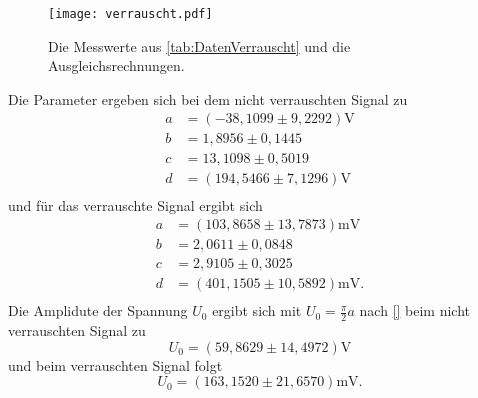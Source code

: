 \begin{figure}[H]
  \centering
  \texttt{[image: verrauscht.pdf]}
  \caption{Die Messwerte aus \autoref{tab:DatenVerrauscht} und die Ausgleichsrechnungen.}
  \label{fig:verrauscht}
\end{figure}
Die Parameter ergeben sich bei dem nicht verrauschten Signal zu
\begin{align*}
  a &= (-38,1099\pm 9,2292)\unit{\volt}\\
  b &= 1,8956\pm 0,1445\\
  c &= 13,1098\pm 0,5019\\
  d &= (194,5466\pm 7,1296)\unit{\volt}\\
\end{align*}
und für das verrauschte Signal ergibt sich
\begin{align*}
  a &= (103,8658\pm 13,7873)\unit{\milli\volt}\\
  b &= 2,0611\pm 0,0848\\
  c &= 2,9105\pm 0,3025\\
  d &= (401,1505\pm 10,5892)\unit{\milli\volt}.\\
\end{align*}
Die Amplidute der Spannung $U_0$ ergibt sich mit $U_0 = \frac{\pi}{2}a$ nach \autoref{} beim nicht verrauschten Signal zu
\begin{equation*}
  U_0 = (59,8629\pm14,4972)\unit{\volt}
\end{equation*}
und beim verrauschten Signal folgt
\begin{equation*}
  U_0 = (163,1520\pm21,6570)\unit{\milli\volt}.
\end{equation*}
